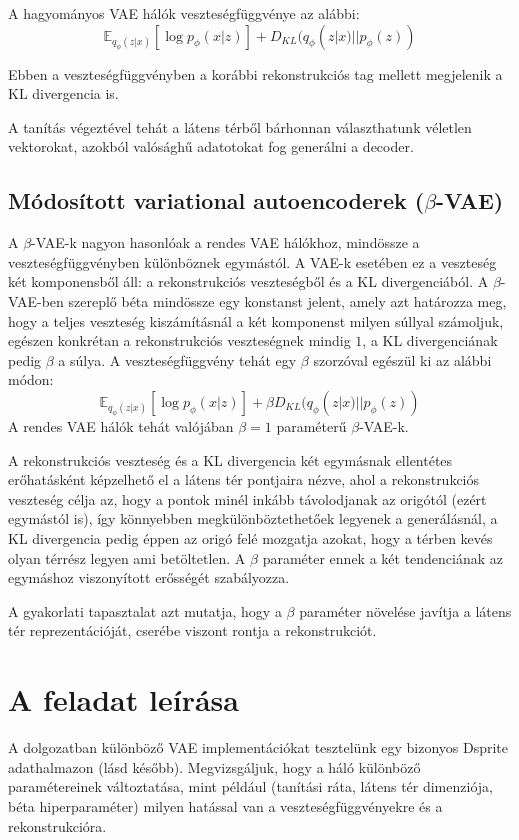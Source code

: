 A hagyományos VAE hálók veszteségfüggvénye az alábbi:
$$ \mathbb{E}_{q_\phi(z|x)} [\log p_\phi(x|z)] + D_{KL}(q_\phi(z|x)||p_\phi(z))$$

Ebben a veszteségfüggvényben a korábbi rekonstrukciós tag mellett megjelenik a KL divergencia is.

A tanítás végeztével tehát a látens térből bárhonnan választhatunk véletlen vektorokat, azokból valósághű adatotokat fog generálni a decoder.

\section{Módosított variational autoencoderek ($\beta$-VAE)}

A $\beta$-VAE-k \cite{bvae} nagyon hasonlóak a rendes VAE hálókhoz, mindössze a veszteségfüggvényben különböznek egymástól. A VAE-k esetében ez a veszteség két komponensből áll: a rekonstrukciós veszteségből és a KL divergenciából. A $\beta$-VAE-ben szereplő béta mindössze egy konstanst jelent, amely azt határozza meg, hogy a teljes veszteség kiszámításnál a két komponenst milyen súllyal számoljuk, egészen konkrétan a rekonstrukciós veszteségnek mindig $1$, a KL divergenciának pedig $\beta$ a súlya. A veszteségfüggvény tehát egy $\beta$ szorzóval egészül ki az alábbi módon:
$$ \mathbb{E}_{q_\phi(z|x)} [\log p_\phi(x|z)] + \beta D_{KL}(q_\phi(z|x)||p_\phi(z))$$
A rendes VAE hálók tehát valójában $\beta=1$ paraméterű $\beta$-VAE-k.

A rekonstrukciós veszteség és a KL divergencia két egymásnak ellentétes erőhatásként képzelhető el a látens tér pontjaira nézve, ahol a rekonstrukciós veszteség célja az, hogy a pontok minél inkább távolodjanak az origótól (ezért egymástól is), így könnyebben megkülönböztethetőek legyenek a generálásnál, a KL divergencia pedig éppen az origó felé mozgatja azokat, hogy a térben kevés olyan térrész legyen ami betöltetlen. A $\beta$ paraméter ennek a két tendenciának az egymáshoz viszonyított erősségét szabályozza.

A gyakorlati tapasztalat azt mutatja, hogy a $\beta$ paraméter növelése javítja a látens tér reprezentációját, cserébe viszont rontja a rekonstrukciót.

\chapter{A feladat leírása}

A dolgozatban különböző VAE implementációkat tesztelünk egy bizonyos Dsprite adathalmazon (lásd később). Megvizsgáljuk, hogy a háló különböző paramétereinek változtatása, mint például (tanítási ráta, látens tér dimenziója, béta hiperparaméter) milyen hatással van a veszteségfüggvényekre és a rekonstrukcióra.

